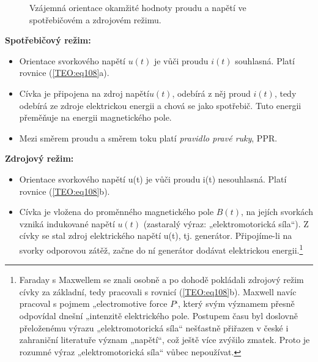     \begin{figure}[ht!]
      \centering  
        {}                    
        {}         \newline               
        {}
      \caption{Vzájemná orientace okamžité hodnoty proudu a napětí ve spotřebičovém a zdrojovém 
               režimu.} 
      \label{teo:fig039}
    \end{figure}
        
    \textbf{Spotřebičový režim:}
    \begin{itemize}[noitemsep]
      \item Orientace svorkového napětí \(u(t)\) je vůči proudu \(i(t)\) souhlasná. Platí rovnice
            (\ref{TEO:eq108}a).
      \item Cívka je připojena na zdroj napětí\(u(t)\), odebírá z něj proud \(i(t)\), tedy odebírá
            ze zdroje elektrickou energii a chová se jako spotřebič. Tuto energii přeměňuje na
            energii magnetického pole.
      \item Mezi směrem proudu a směrem toku platí \emph{pravidlo pravé ruky}, PPR.           
    \end{itemize}
    
    \textbf{Zdrojový režim:}
    \begin{itemize}[noitemsep]
      \item Orientace svorkového napětí u(t) je vůči proudu i(t) nesouhlasná. Platí rovnice
            (\ref{TEO:eq108}b).
      \item Cívka je vložena do proměnného magnetického pole \(B(t)\), na jejích svorkách vzniká
            indukované napětí \(u(t)\) (zastaralý výraz: „elektromotorická síla“). Z cívky se stal
            zdroj elektrického napětí u(t), tj. generátor. Připojíme-li na svorky odporovou zátěž,
            začne do ní generátor dodávat elektrickou energii.\footnote{Faraday s Maxwellem se znali
            osobně a po dohodě pokládali zdrojový režim cívky za základní, tedy pracovali s rovnicí
            (\ref{TEO:eq108}b). Maxwell navíc pracoval s pojmem „electromotive force \(P\)‘, který
            svým významem přesně odpovídal dnešní „intenzitě elektrického pole. Postupem času byl
            doslovně přeloženému výrazu „elektromotorická síla“ nešťastně přiřazen v české i
            zahraniční literatuře význam „napětí“, což ještě více zvýšilo zmatek. Proto je rozumné
            výraz „elektromotorická síla“ vůbec nepoužívat.}
    \end{itemize}

